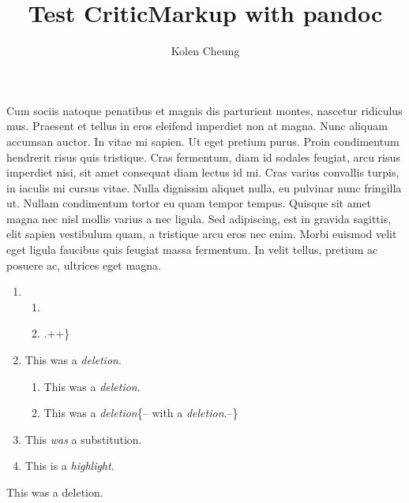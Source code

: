 \documentclass[]{article}
\title{Test CriticMarkup with pandoc}
\author{Kolen Cheung}
\date{}
\providecommand{\tightlist}{%
  \setlength{\itemsep}{0pt}\setlength{\parskip}{0pt}}
\begin{document}
\maketitle

Cum sociis natoque penatibus et magnis dis parturient montes, nascetur
ridiculus mus. Praesent et tellus in eros eleifend imperdiet non at
magna. Nunc aliquam accumsan auctor. In vitae mi sapien. Ut eget pretium
purus. Proin condimentum hendrerit risus quis tristique. Cras fermentum,
diam id sodales feugiat, arcu risus imperdiet nisi, sit amet consequat
diam lectus id mi. Cras varius convallis turpis, in iaculis mi cursus
vitae. Nulla dignissim aliquet nulla, eu pulvinar nunc fringilla ut.
Nullam condimentum tortor eu quam tempor tempus. Quisque sit amet magna
nec nisl mollis varius a nec ligula. Sed adipiscing, est in gravida
sagittis, elit sapien vestibulum quam, a tristique arcu eros nec enim.
Morbi euismod velit eget ligula faucibus quis feugiat massa fermentum.
In velit tellus, pretium ac posuere ac, ultrices eget magna.

\begin{enumerate}
\def\labelenumi{\arabic{enumi}.}
\item
  \begin{enumerate}
  \def\labelenumii{\arabic{enumii}.}
  \item
  \item
    .++\}
  \end{enumerate}
\item
  This was a \emph{deletion}.

  \begin{enumerate}
  \def\labelenumii{\arabic{enumii}.}
  \tightlist
  \item
    This was a \emph{deletion}.
  \item
    This was a \emph{deletion}\{-- with a \emph{deletion}.--\}
  \end{enumerate}
\item
  This \emph{was} a substitution.
\item
  This is a \emph{highlight}.
\end{enumerate}

This was a deletion.
\end{document}
